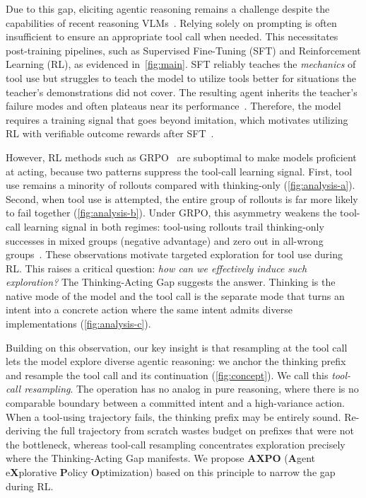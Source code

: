\documentclass{llmxive}
\providecommand{\gap}{Thinking-Acting Gap\xspace}
\providecommand{\toolresample}{tool-call resampling\xspace}
\begin{document}
Due to this gap, eliciting agentic reasoning remains a challenge despite the  capabilities of recent reasoning VLMs~\citep{Qwen3VL}. Relying solely on prompting is often insufficient to ensure an appropriate tool call when needed. This necessitates post-training pipelines, such as Supervised Fine-Tuning (SFT) and Reinforcement Learning (RL), as evidenced in~\autoref{fig:main}.
SFT reliably teaches the \emph{mechanics} of tool use but struggles to teach the model to utilize tools better for situations the teacher's demonstrations did not cover. The resulting agent inherits the teacher's failure modes and often plateaus near its performance~\citep{AgentDistill, dagger}.
Therefore, the model requires a training signal that goes beyond imitation, which motivates utilizing RL with verifiable outcome rewards after SFT~\citep{pyvision-rl, AgenticReasoningRL, deepeyesv2}.

However, RL methods such as GRPO~\citep{GRPO,DAPO,prorl} are suboptimal to make models proficient at acting, because two patterns suppress the tool-call learning signal.
First, tool use remains a minority of rollouts compared with thinking-only (\autoref{fig:analysis-a}).
Second, when tool use is attempted, the entire group of rollouts is far more likely to fail together (\autoref{fig:analysis-b}).
Under GRPO, this asymmetry weakens the tool-call learning signal in both regimes: tool-using rollouts trail thinking-only successes in mixed groups (negative advantage) and zero out in all-wrong groups~\citep{pope, sage}.
These observations motivate targeted exploration for tool use during RL. This raises a critical question: \emph{how can we effectively induce such exploration?}
The \gap suggests the answer.
Thinking is the native mode of the model and the tool call is the separate mode that turns an intent into a concrete action where the same intent admits diverse implementations (\autoref{fig:analysis-c}).

Building on this observation, our key insight is that resampling at the tool call lets the model explore diverse agentic reasoning: we anchor the thinking prefix and resample the tool call and its continuation (\autoref{fig:concept}).
We call this \emph{\toolresample}.
The operation has no analog in pure reasoning, where there is no comparable boundary between a committed intent and a high-variance action.
When a tool-using trajectory fails, the thinking prefix may be entirely sound. Re-deriving the full trajectory from scratch wastes budget on prefixes that were not the bottleneck, whereas \toolresample concentrates exploration precisely where the \gap manifests. We propose \textbf{AXPO} (\textbf{A}gent e\textbf{X}plorative \textbf{P}olicy \textbf{O}ptimization) based on this principle to narrow the gap during RL.
\end{document}
